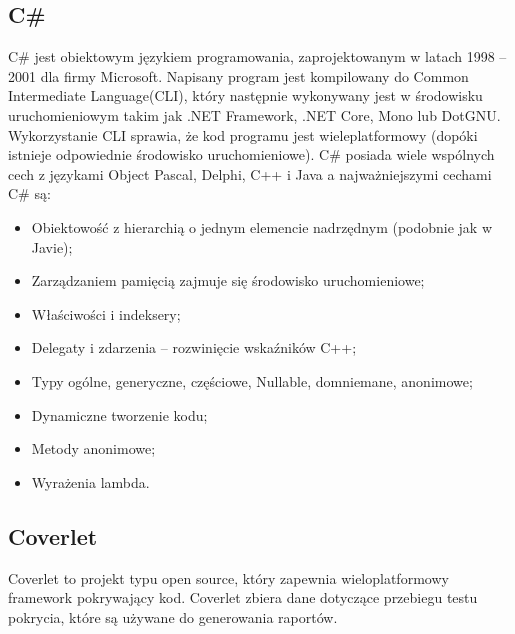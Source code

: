 \documentclass[12pt,a4paper]{article}
\begin{document}
		\subsection{C\#}
			\indent C\# jest obiektowym językiem programowania, zaprojektowanym w latach 1998 – 2001 dla firmy Microsoft.
			Napisany program jest kompilowany do Common Intermediate Language(CLI), który następnie wykonywany jest w środowisku uruchomieniowym takim jak .NET Framework,
			.NET Core, Mono lub DotGNU.
			Wykorzystanie CLI sprawia, że kod programu jest wieleplatformowy (dopóki istnieje odpowiednie środowisko uruchomieniowe).
			C\# posiada wiele wspólnych cech z językami Object Pascal, Delphi, C++ i Java a najważniejszymi cechami C\# są:
			\begin{itemize}
				\item Obiektowość z hierarchią o jednym elemencie nadrzędnym (podobnie jak w Javie);
				\item Zarządzaniem pamięcią zajmuje się środowisko uruchomieniowe;
				\item Właściwości i indeksery;
				\item Delegaty i zdarzenia – rozwinięcie wskaźników C++;
				\item Typy ogólne, generyczne, częściowe, Nullable, domniemane, anonimowe;
				\item Dynamiczne tworzenie kodu;
				\item Metody anonimowe;
				\item Wyrażenia lambda.
			\end{itemize}
		
		\subsection{Coverlet}
			\indent Coverlet to projekt typu open source, który zapewnia wieloplatformowy framework
			pokrywający kod. Coverlet zbiera dane dotyczące przebiegu testu pokrycia,
			które są używane do generowania raportów.
		
\end{document}
